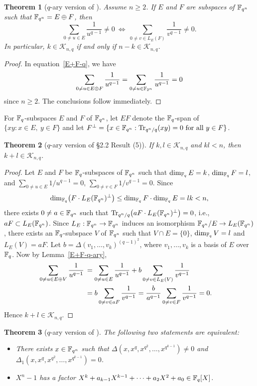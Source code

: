 \documentclass{amsart}
\newtheorem{thm}{Theorem}[section]
\numberwithin{equation}{section}
\theoremstyle{definition}
\newcommand{\f}{\Bbb F}
\newcommand{\tr}{\text{\rm Tr}}
\begin{document}
\begin{thm}[$q$-ary version of {\cite[Theorem~3]{Carlet-pre}}]\label{q-duality}
Assume $n\ge 2$. If $E$ and $F$ are subspaces of $\f_{q^n}$ such that $\f_{q^n}=E\oplus F$, then
\[
\sum_{0\ne u\in E}\frac 1{u^{q-1}}\ne 0\ \Leftrightarrow\ \sum_{0\ne v\in L_E(F)}\frac 1{v^{q-1}}\ne 0.
\]
In particular, $k\in\mathcal K_{n,q}$ if and only if $n-k\in\mathcal K_{n,q}$.
\end{thm}

\begin{proof}
In equation~\eqref{E+F-q}, we have
\[
\sum_{0\ne u\in E\oplus F}\frac 1{u^{q-1}}=\sum_{0\ne u\in\f_{2^n}}\frac 1{u^{q-1}}=0
\]
since $n\ge 2$. The conclusions follow immediately.
\end{proof}

For $\f_q$-subspaces $E$ and $F$ of $\f_{q^n}$, let $EF$ denote the $\f_q$-span of $\{xy:x\in E,\ y\in F\}$ and let $F^\bot=\{x\in\f_{q^n}:\tr_{q^n/q}(xy)=0\ \text{for all}\ y\in F\}$. 

\begin{thm}[$q$-ary version of \S2.2 Result (5)]\label{k+l}
If $k,l\in\mathcal K_{n,q}$ and $kl<n$, then $k+l\in\mathcal K_{n,q}$.
\end{thm}

\begin{proof}
Let $E$ and $F$ be $\f_q$-subspaces of $\f_{q^n}$ such that $\dim_{\f_q}E=k$, $\dim_{\f_q}F=l$, and $\sum_{0\ne u\in E}1/u^{q-1}=0$, $\sum_{0\ne v\in F}1/v^{q-1}=0$. Since
\[
\dim_{\f_q}\bigl(F\cdot L_E(\f_{q^n})^\bot\bigr)\le\dim_{\f_q}F\cdot\dim_{\f_q}E=lk<n,
\]
there exists $0\ne a\in\f_{q^n}$ such that $\tr_{q^n/q}\bigl(aF\cdot L_E(\f_{q^n})^\bot\bigr)=0$, i.e., $aF\subset L_E(\f_{q^n})$. Since $L_E:\f_{q^n}\to\f_{q^n}$ induces an isomorphism $\f_{q^n}/E\to L_E(\f_{q^n})$, there exists an $\f_q$-subspace $V$ of $\f_{q^n}$ such that 
$V\cap E=\{0\}$, $\dim_{\f_q}V=l$ and $L_E(V)=aF$. Let $b=\Delta(v_1,\dots,v_k)^{(q-1)^2}$, where $v_1,\dots,v_k$ is a basis of $E$ over $\f_q$. Now by Lemma~\ref{E+F-q-ary},
\begin{align*}
\sum_{0\ne u\in E\oplus V}\frac 1{u^{q-1}}\,&=\sum_{0\ne u\in E}\frac 1{u^{q-1}}+b\sum_{0\ne v\in L_E(V)}\frac 1{v^{q-1}}\cr
&=b\sum_{0\ne v\in aF}\frac 1{v^{q-1}}
=\frac b{a^{q-1}}\sum_{0\ne v\in F}\frac 1{v^{q-1}}= 0.
\end{align*}
Hence $k+l\in\mathcal K_{n,q}$.
\end{proof}

\begin{thm}[$q$-ary version of {\cite[Theorem~3.1]{Carlet-Hou}}]\label{factor-xn-1}
The following two statements are equivalent:
\begin{itemize}
\item[(i)] There exists $x\in\f_{q^n}$ such that $\Delta(x,x^q,x^{q^2},\dots,x^{q^{k-1}})\ne0$ and\\ $\Delta_1(x,x^q,x^{q^2},\dots,x^{q^{k-1}})=0$.

\item[(ii)] $X^n-1$ has a factor $X^k+a_{k-1}X^{k-1}+\cdots+a_2X^2+a_0\in\f_q[X]$.
\end{itemize}
\end{thm}
\end{document}
